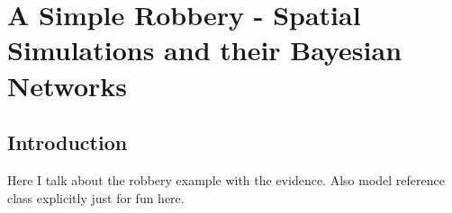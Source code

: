  

\chapter[Simple Spatial Simulations]{A Simple Robbery - Spatial Simulations and their Bayesian Networks}

\section{Introduction}
Here I talk about the robbery example with the evidence.
Also model reference class explicitly just for fun here.
